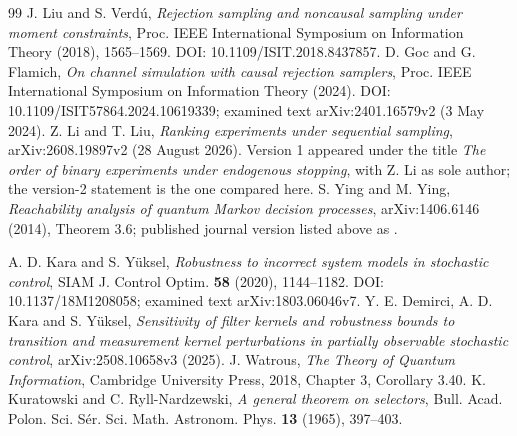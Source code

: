 \begin{thebibliography}{99}
 J. Liu and S. Verd\'u, \emph{Rejection sampling and noncausal sampling under moment constraints}, Proc. IEEE International Symposium on Information Theory (2018), 1565--1569. DOI: 10.1109/ISIT.2018.8437857.
 D. Goc and G. Flamich, \emph{On channel simulation with causal rejection samplers}, Proc. IEEE International Symposium on Information Theory (2024). DOI: 10.1109/ISIT57864.2024.10619339; examined text arXiv:2401.16579v2 (3 May 2024).
 Z. Li and T. Liu, \emph{Ranking experiments under sequential sampling}, arXiv:2608.19897v2 (28 August 2026). Version 1 appeared under the title \emph{The order of binary experiments under endogenous stopping}, with Z. Li as sole author; the version-2 statement is the one compared here.
 S. Ying and M. Ying, \emph{Reachability analysis of quantum Markov decision processes}, arXiv:1406.6146 (2014), Theorem 3.6; published journal version listed above as \cite{Ying18}.

 A. D. Kara and S. Y\"uksel, \emph{Robustness to incorrect system models in stochastic control}, SIAM J. Control Optim. \textbf{58} (2020), 1144--1182. DOI: 10.1137/18M1208058; examined text arXiv:1803.06046v7.
 Y. E. Demirci, A. D. Kara and S. Y\"uksel, \emph{Sensitivity of filter kernels and robustness bounds to transition and measurement kernel perturbations in partially observable stochastic control}, arXiv:2508.10658v3 (2025).
 J. Watrous, \emph{The Theory of Quantum Information}, Cambridge University Press, 2018, Chapter 3, Corollary 3.40.
 K. Kuratowski and C. Ryll-Nardzewski, \emph{A general theorem on selectors}, Bull. Acad. Polon. Sci. S\'er. Sci. Math. Astronom. Phys. \textbf{13} (1965), 397--403.


\end{thebibliography}
